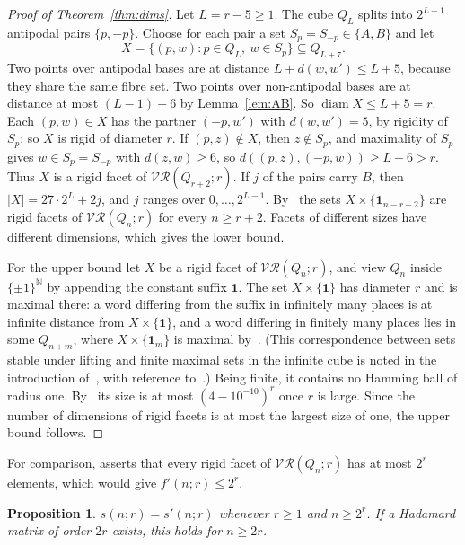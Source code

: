 \documentclass[11pt]{amsart}
\newtheorem{proposition}[theorem]{Proposition}
\theoremstyle{remark}
\newcommand{\VR}{\mathcal{VR}}
\newcommand{\one}{\mathbf 1}
\DeclareMathOperator{\diam}{diam}
\begin{document}
\begin{proof}[Proof of Theorem~\ref{thm:dims}]
Let $L=r-5\ge1$. The cube $Q_L$ splits into $2^{L-1}$ antipodal pairs $\{p,-p\}$. Choose for each pair a set
$S_p=S_{-p}\in\{A,B\}$ and let
\[
X=\{(p,w): p\in Q_L,\ w\in S_p\}\subseteq Q_{L+7}.
\]
Two points over antipodal bases are at distance $L+d(w,w')\le L+5$, because they share the same fibre set. Two points
over non-antipodal bases are at distance at most $(L-1)+6$ by Lemma~\ref{lem:AB}. So $\diam X\le L+5=r$. Each
$(p,w)\in X$ has the partner $(-p,w')$ with $d(w,w')=5$, by rigidity of $S_p$; so $X$ is rigid of diameter $r$. If
$(p,z)\notin X$, then $z\notin S_p$, and maximality of $S_p$ gives $w\in S_p=S_{-p}$ with $d(z,w)\ge6$, so
$d((p,z),(-p,w))\ge L+6>r$. Thus $X$ is a rigid facet of $\VR(Q_{r+2};r)$. If $j$ of the pairs carry $B$, then
$|X|=27\cdot2^L+2j$, and $j$ ranges over $0,\dots,2^{L-1}$. By~\cite[Corollary~6]{BFW} the sets
$X\times\{\one_{n-r-2}\}$ are rigid facets of $\VR(Q_n;r)$ for every $n\ge r+2$. Facets of different sizes have
different dimensions, which gives the lower bound.

For the upper bound let $X$ be a rigid facet of $\VR(Q_n;r)$, and view $Q_n$ inside $\{\pm1\}^{\mathbb N}$ by appending
the constant suffix $\one$. The set $X\times\{\one\}$ has diameter $r$ and is maximal there: a word differing from the
suffix in infinitely many places is at infinite distance from $X\times\{\one\}$, and a word differing in finitely many
places lies in some $Q_{n+m}$, where $X\times\{\one_m\}$ is maximal by~\cite[Corollary~6]{BFW}. (This correspondence
between sets stable under lifting and finite maximal sets in the infinite cube is noted in the introduction
of~\cite{BS}, with reference to~\cite{BFW}.)
Being finite, it contains no
Hamming ball of radius one. By~\cite[Theorem~3]{BS} its size is at most $(4-10^{-10})^r$ once $r$ is large. Since the
number of dimensions of rigid facets is at most the largest size of one, the upper bound follows.
\end{proof}

For comparison, \cite[Conjecture~1]{BFW} asserts that every rigid facet of $\VR(Q_n;r)$ has at most $2^r$ elements, which would
give $f'(n;r)\le2^r$.

\begin{proposition}\label{prop:smallest}
$s(n;r)=s'(n;r)$ whenever $r\ge1$ and $n\ge2^r$. If a Hadamard matrix of order $2r$ exists, this holds for $n\ge 2r$.
\end{proposition}
\end{document}
